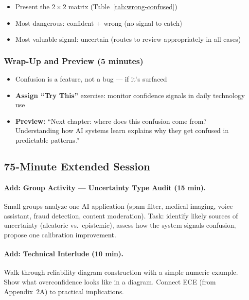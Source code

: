 \begin{itemize}
    \item Present the $2\times2$ matrix (Table~\ref{tab:wrong-confused})
    \item Most dangerous: confident + wrong (no signal to catch)
    \item Most valuable signal: uncertain (routes to review appropriately in all cases)
\end{itemize}

\subsubsection{Wrap-Up and Preview (5 minutes)}

\begin{itemize}
    \item Confusion is a feature, not a bug --- if it's surfaced
    \item \textbf{Assign ``Try This''} exercise: monitor confidence signals in daily technology use
    \item \textbf{Preview:} ``Next chapter: where does this confusion come from? Understanding how AI systems learn explains why they get confused in predictable patterns.''
\end{itemize}

\subsection{75-Minute Extended Session}

\paragraph{Add: Group Activity --- Uncertainty Type Audit (15 min).}
Small groups analyze one AI application (spam filter, medical imaging, voice assistant, fraud detection, content moderation). Task: identify likely sources of uncertainty (aleatoric vs.\ epistemic), assess how the system signals confusion, propose one calibration improvement.

\paragraph{Add: Technical Interlude (10 min).}
Walk through reliability diagram construction with a simple numeric example. Show what overconfidence looks like in a diagram. Connect ECE (from Appendix~2A) to practical implications.


